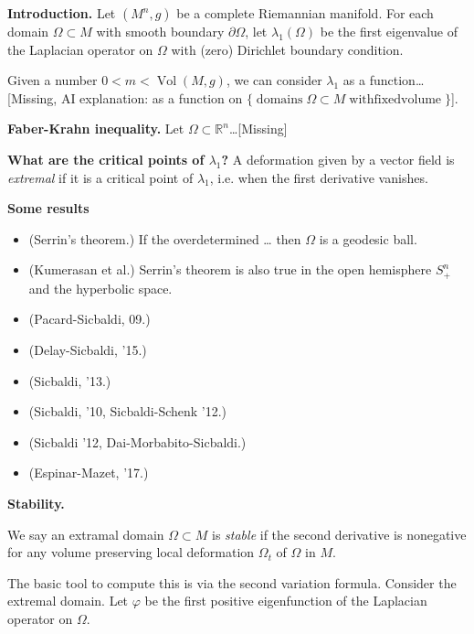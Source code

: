 \medskip\noindent
{\bf Introduction.}
Let $(M^n,g)$ be a complete Riemannian
manifold.
For each domain $\Omega \subset M$ with
smooth boundary $\partial \Omega$, let
$\lambda_1(\Omega)$ be the first eigenvalue
of the Laplacian operator on $\Omega$ with
(zero) Dirichlet boundary condition.

Given a number $0<m<
\operatorname{Vol}(M,g)$,
we can consider $\lambda_1$ as a
function… [Missing, AI explanation:
as a function on 
$\{\operatorname{domains}\Omega\subset M
\operatorname{with fixed volume}\}$].

\medskip\noindent
{\bf Faber-Krahn inequality.}
Let $\Omega\subset \mathbb{R}^n$…[Missing]

\medskip\noindent
{\bf What are the critical points
of $\lambda_1$?}
A deformation given by a vector field
is {\it extremal} if it is
a critical point of $\lambda_1$,
i.e. when the first derivative vanishes.

\medskip\noindent
{\bf Some results }
\begin{itemize}
\item (Serrin's theorem.) 
If the overdetermined … then $\Omega$ is a 
geodesic ball.
\item (Kumerasan et al.) 
Serrin's theorem is also true in the
open hemisphere $S^n_+$ and the hyperbolic
space.
\item (Pacard-Sicbaldi, 09.)
\item (Delay-Sicbaldi, '15.)
\item (Sicbaldi, '13.)
\item (Sicbaldi, '10, Sicbaldi-Schenk '12.)
\item (Sicbaldi '12, Dai-Morbabito-Sicbaldi.)
\item (Espinar-Mazet, '17.)
\end{itemize}

\begin{example}[Shklover, 2000]
\label{example-shklover00}
\end{example}

\medskip\noindent
{\bf Stability.}
\begin{definition}[Stability]
\label{definition-duplicate-2}
We say an extramal domain
 $\Omega \subset M$ is {\it stable} 
if the second derivative is nonegative for
any volume preserving local deformation
$\Omega_t$ of $\Omega$ in $M$.
\end{definition}

\noindent
The basic tool to compute this is via the
second variation formula. Consider the
extremal domain. Let $\varphi$ be the first
positive eigenfunction of the Laplacian
operator on $\Omega$.

